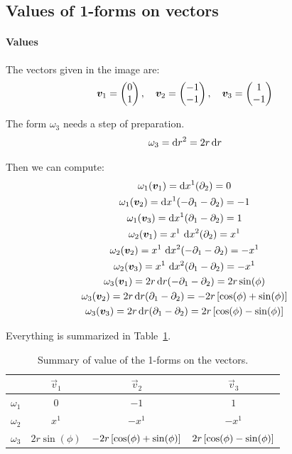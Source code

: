\documentclass[11pt, english, fleqn, DIV=15, headinclude, BCOR=1cm]{scrartcl}
\begin{document}
\subsection{Values of 1-forms on vectors}

\paragraph{Values}

The vectors given in the image are:
\[
    \boldsymbol{v}_1 = \begin{pmatrix} 0 \\ 1 \end{pmatrix}
    ,\quad
    \boldsymbol{v}_2 = \begin{pmatrix} -1 \\ -1 \end{pmatrix}
    ,\quad
    \boldsymbol{v}_3 = \begin{pmatrix} 1 \\ -1 \end{pmatrix}
\]

The form $\omega_3$ needs a step of preparation.
\[
    \omega_3 = \mathop{}\!\mathrm d r^2 = 2 r \mathop{}\!\mathrm d r
\]

Then we can compute:
\begin{gather*}
    \omega_1(\vec v_1) = \dif x^1 (\partial_2) = 0 \\
    \omega_1(\vec v_2) = \dif x^1 (-\partial_1-\partial_2) = -1 \\
    \omega_1(\vec v_3) = \dif x^1 (\partial_1-\partial_2) = 1 \\
    \omega_2(\vec v_1) = x^1 \, \dif x^2 (\partial_2) = x^1 \\
    \omega_2(\vec v_2) = x^1 \, \dif x^2 (-\partial_1-\partial_2) = -x^1 \\
    \omega_2(\vec v_3) = x^1 \, \dif x^2 (\partial_1-\partial_2) = - x^1  \\
    \omega_3(\vec v_1) = 2 r \dif r (-\partial_1-\partial_2) = 2 r \sin(\phi) \\
    \omega_3(\vec v_2) = 2 r \dif r (\partial_1-\partial_2) = - 2 r
    \sbr{\cos(\phi) + \sin(\phi)} \\
    \omega_3(\vec v_3) = 2 r \dif r (\partial_1-\partial_2) = 2 r
    \sbr{\cos(\phi) - \sin(\phi)}
\end{gather*}

Everything is summarized in Table~\ref{tab:values}.

\begin{table}[htbp]
    \centering
    \begin{tabular}{c|ccc}
        & $\vec v_1$ & $\vec v_2$ & $\vec v_3$ \\
        \midrule
        $\omega_1$ & $0$ & $-1$ & $1$ \\
        $\omega_2$ & $x^1$ & $- x^1$ & $- x^1$ \\
        $\omega_3$ & $2 r \sin(\phi)$ & $- 2 r
        \left[ \cos(\phi) + \sin(\phi) \right]$ & $2 r
        \left[ \cos(\phi) - \sin(\phi) \right]$ \\
    \end{tabular}
    \caption{%
        Summary of value of the 1-forms on the vectors.
    }
    \label{tab:values}
\end{table}
\end{document}
